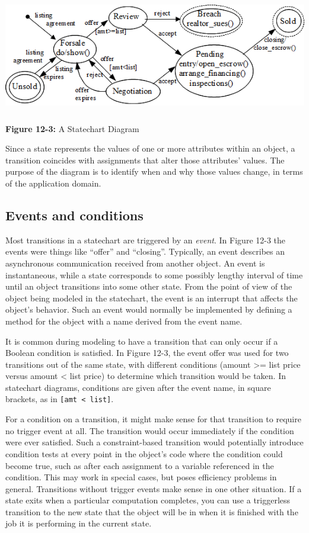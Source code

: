 \bigskip

\includegraphics[width=5.8in,height=2.0in]{ub-img/statechart.png}

{\sffamily\bfseries Figure 12-3:}
{\sffamily A Statechart Diagram}

\bigskip

Since a state represents the values of one or more attributes within an
object, a transition coincides with assignments that alter those
attributes' values. The purpose of the diagram is to
identify when and why those values change, in terms of the application
domain.

\subsection{Events and conditions}

Most transitions in a statechart are triggered by an \textit{event}. In Figure 12-3 the events were things like
``offer'' and ``closing''.  Typically, an event describes an asynchronous
communication received from another object. An event is instantaneous, while a
state corresponds to some possibly lengthy interval of time until an object
transitions into some other state.  From the point of view of the object being
modeled in the statechart, the event is an interrupt that affects the object's
behavior. Such an event would normally be implemented by defining a method for
the object with a name derived from the event name.

It is common during modeling to have a transition that can only occur if a
Boolean condition is satisfied. In Figure 12-3, the event offer was used for
two transitions out of the same state, with different conditions (amount
{\textgreater}= list price versus amount {\textless} list price) to determine
which transition would be taken. In statechart diagrams, conditions are given
after the event name, in square brackets, as in
\texttt{[amt {\textless} list]}.

For a condition on a transition, it might make sense for that
transition to require no trigger event at all. The transition would
occur immediately if the condition were ever satisfied. Such a
constraint-based transition would potentially introduce condition tests
at every point in the object's code where the
condition could become true, such as after each assignment to a
variable referenced in the condition. This may work in special
cases, but poses efficiency problems in general. Transitions without
trigger events make sense in one other situation. If a state exits when
a particular computation completes, you can use a triggerless
transition to the new state that the object will be in when it is
finished with the job it is performing in the current state.


